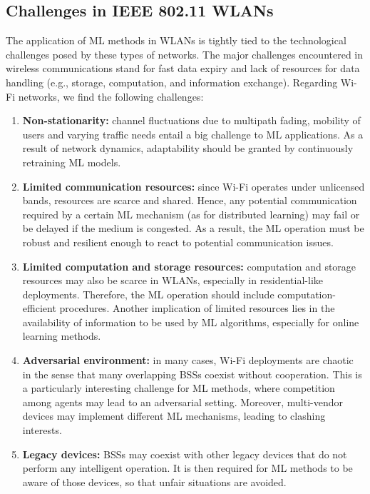 \documentclass{article}
\begin{document}
\subsection{Challenges in IEEE 802.11 WLANs}
\label{section:ieee_80211_wlans}
The application of ML methods in WLANs is tightly tied to the technological challenges posed by these types of networks. The major challenges encountered in wireless communications stand for fast data expiry and lack of resources for data handling (e.g., storage, computation, and information exchange). Regarding Wi-Fi networks, we find the following challenges:
\begin{enumerate}
	\item \textbf{Non-stationarity:} channel fluctuations due to multipath fading, mobility of users and varying traffic needs entail a big challenge to ML applications. As a result of network dynamics, adaptability should be granted by continuously retraining ML models.
	\item \textbf{Limited communication resources:} since Wi-Fi operates under unlicensed bands, resources are scarce and shared. Hence, any potential communication required by a certain ML mechanism (as for distributed learning) may fail or be delayed if the medium is congested. As a result, the ML operation must be robust and resilient enough to react to potential communication issues.
	\item \textbf{Limited computation and storage resources:} computation and storage resources may also be scarce in WLANs, especially in residential-like deployments. Therefore, the ML operation should include computation-efficient procedures. Another implication of limited resources lies in the availability of information to be used by ML algorithms, especially for online learning methods.
	\item \textbf{Adversarial environment:} in many cases, Wi-Fi deployments are chaotic in the sense that many overlapping BSSs coexist without cooperation. This is a particularly interesting challenge for ML methods, where competition among agents may lead to an adversarial setting. Moreover, multi-vendor devices may implement different ML mechanisms, leading to clashing interests.
	\item \textbf{Legacy devices:} BSSs may coexist with other legacy devices that do not perform any intelligent operation. It is then required for ML methods to be aware of those devices, so that unfair situations are avoided.
\end{enumerate}
\end{document}
